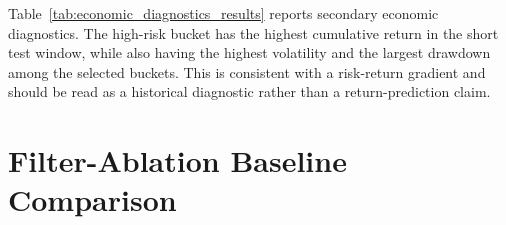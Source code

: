 \begin{table}[H]
\centering
\scriptsize
\caption{Risk separation for the final test split}
\label{tab:risk_separation_results}
\end{table}

Table~\ref{tab:economic_diagnostics_results} reports secondary economic diagnostics. The high-risk bucket has the highest cumulative return in the short test window, while also having the highest volatility and the largest drawdown among the selected buckets. This is consistent with a risk-return gradient and should be read as a historical diagnostic rather than a return-prediction claim.

\begin{table}[H]
\centering
\scriptsize
\caption{Secondary economic diagnostics for the final test split}
\label{tab:economic_diagnostics_results}
\end{table}

\section{Filter-Ablation Baseline Comparison}
\label{sec:baseline_ablation_results}

